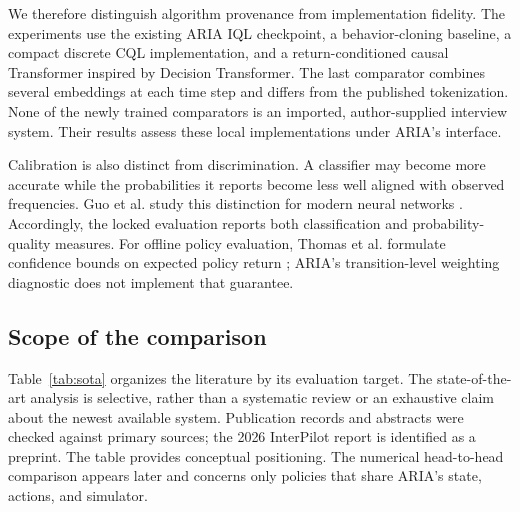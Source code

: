 \documentclass[10pt,a4paper]{article}
\begin{document}
We therefore distinguish algorithm provenance from implementation fidelity. The experiments use the existing ARIA IQL checkpoint, a behavior-cloning baseline, a compact discrete CQL implementation, and a return-conditioned causal Transformer inspired by Decision Transformer. The last comparator combines several embeddings at each time step and differs from the published tokenization. None of the newly trained comparators is an imported, author-supplied interview system. Their results assess these local implementations under ARIA's interface.

Calibration is also distinct from discrimination. A classifier may become more accurate while the probabilities it reports become less well aligned with observed frequencies. Guo et al. study this distinction for modern neural networks \cite{calibration}. Accordingly, the locked evaluation reports both classification and probability-quality measures. For offline policy evaluation, Thomas et al. formulate confidence bounds on expected policy return \cite{ope}; ARIA's transition-level weighting diagnostic does not implement that guarantee.

\subsection{Scope of the comparison}
Table~\ref{tab:sota} organizes the literature by its evaluation target. The state-of-the-art analysis is selective, rather than a systematic review or an exhaustive claim about the newest available system. Publication records and abstracts were checked against primary sources; the 2026 InterPilot report is identified as a preprint. The table provides conceptual positioning. The numerical head-to-head comparison appears later and concerns only policies that share ARIA's state, actions, and simulator.
\end{document}
